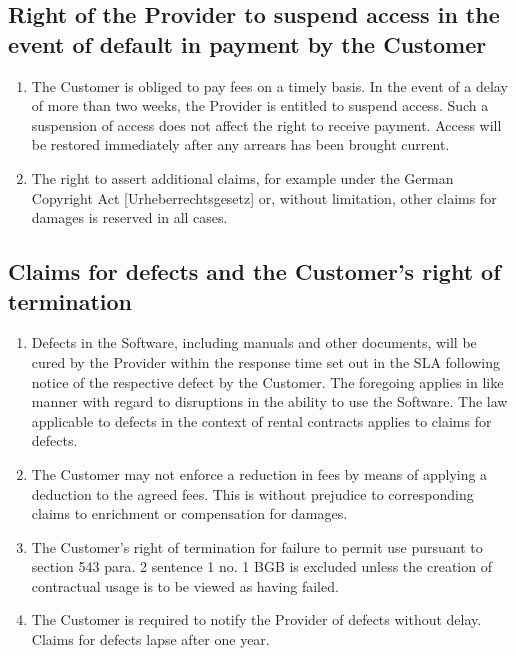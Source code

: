 \documentclass{terms}
\begin{document}
\subsection{Right of the Provider to suspend access in the event of default in payment by the Customer}
\begin{enumerate}
\item The Customer is obliged to pay fees on a timely basis. In the event of a delay of more than two weeks, the Provider is entitled to suspend access. Such a suspension of access does not affect the right to receive payment. Access will be restored immediately after any arrears has been brought current.
\item The right to assert additional claims, for example under the German Copyright Act [Urheberrechtsgesetz] or, without limitation, other claims for damages is reserved in all cases.
\end{enumerate}
\subsection{Claims for defects and the Customer's right of termination}
\begin{enumerate}
\item Defects in the Software, including manuals and other documents, will be cured by the Provider within the response time set out in the SLA following notice of the respective defect by the Customer. The foregoing applies in like manner with regard to disruptions in the ability to use the Software. The law applicable to defects in the context of rental contracts applies to claims for defects.
\item The Customer may not enforce a reduction in fees by means of applying a deduction to the agreed fees. This is without prejudice to corresponding claims to enrichment or compensation for damages.
\item The Customer's right of termination for failure to permit use pursuant to section 543 para. 2 sentence 1 no. 1 BGB is excluded unless the creation of contractual usage is to be viewed as having failed.
\item The Customer is required to notify the Provider of defects without delay. Claims for defects lapse after one year.
\end{enumerate}
\end{document}
